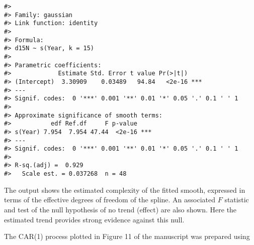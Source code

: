 \documentclass[12pt,]{article}
\newenvironment{Shaded}{\begin{snugshade}}{\end{snugshade}}
\newcommand{\CommentTok}[1]{\textcolor[rgb]{0.56,0.35,0.01}{\textit{#1}}}
\newcommand{\KeywordTok}[1]{\textcolor[rgb]{0.13,0.29,0.53}{\textbf{#1}}}
\newcommand{\NormalTok}[1]{#1}
\newcommand{\OperatorTok}[1]{\textcolor[rgb]{0.81,0.36,0.00}{\textbf{#1}}}
\begin{document}
\begin{Shaded}
\end{Shaded}

\begin{verbatim}
#> 
#> Family: gaussian 
#> Link function: identity 
#> 
#> Formula:
#> d15N ~ s(Year, k = 15)
#> 
#> Parametric coefficients:
#>             Estimate Std. Error t value Pr(>|t|)    
#> (Intercept)  3.30909    0.03489   94.84   <2e-16 ***
#> ---
#> Signif. codes:  0 '***' 0.001 '**' 0.01 '*' 0.05 '.' 0.1 ' ' 1
#> 
#> Approximate significance of smooth terms:
#>           edf Ref.df     F p-value    
#> s(Year) 7.954  7.954 47.44  <2e-16 ***
#> ---
#> Signif. codes:  0 '***' 0.001 '**' 0.01 '*' 0.05 '.' 0.1 ' ' 1
#> 
#> R-sq.(adj) =  0.929   
#>   Scale est. = 0.037268  n = 48
\end{verbatim}

The output shows the estimated complexity of the fitted smooth,
expressed in terms of the effective degrees of freedom of the spline. An
associated \(F\) statistic and test of the null hypothesis of no trend
(effect) are also shown. Here the estimated trend provides strong
evidence against this null.

The CAR(1) process plotted in Figure 11 of the manuscript was prepared
using
\end{document}
